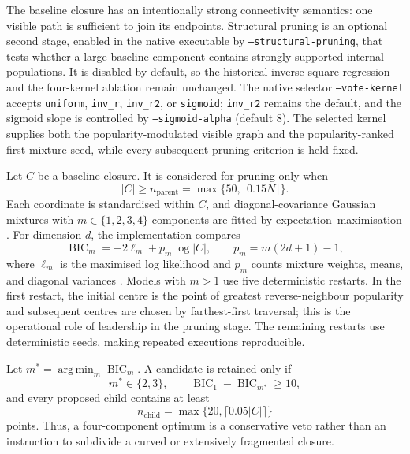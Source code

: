 \documentclass[pdflatex,sn-mathphys-num]{sn-jnl}
\newcommand{\argmin}{\operatorname*{arg\,min}}
\begin{document}
The baseline closure has an intentionally strong connectivity semantics: one
visible path is sufficient to join its endpoints.  Structural pruning is an
optional second stage, enabled in the native executable by
\texttt{--structural-pruning}, that tests whether a large baseline component
contains strongly supported internal populations.  It is disabled by default,
so the historical inverse-square regression and the four-kernel ablation remain
unchanged.  The native selector \texttt{--vote-kernel} accepts
\texttt{uniform}, \texttt{inv\_r}, \texttt{inv\_r2}, or \texttt{sigmoid};
\texttt{inv\_r2} remains the default, and the sigmoid slope is controlled by
\texttt{--sigmoid-alpha} (default $8$).  The selected kernel supplies both the
popularity-modulated visible graph and the popularity-ranked first mixture
seed, while every subsequent pruning criterion is held fixed.

Let $C$ be a baseline closure.  It is considered for pruning only when
\begin{equation}
|C|\geq n_{\mathrm{parent}}
=\max\{50,\lceil0.15N\rceil\}.
\label{eq:pruning_parent_size}
\end{equation}
Each coordinate is standardised within $C$, and diagonal-covariance Gaussian
mixtures with $m\in\{1,2,3,4\}$ components are fitted by expectation--maximisation
\citep{DempsterLairdRubin1977}.  For dimension $d$, the implementation compares
\begin{equation}
\operatorname{BIC}_m=-2\ell_m+p_m\log |C|,
\qquad p_m=m(2d+1)-1,
\label{eq:pruning_bic}
\end{equation}
where $\ell_m$ is the maximised log likelihood and $p_m$ counts mixture
weights, means, and diagonal variances \citep{Schwarz1978}.  Models with
$m>1$ use five deterministic restarts.  In the first restart, the initial
centre is the point of greatest reverse-neighbour popularity and subsequent
centres are chosen by farthest-first traversal; this is the operational role
of leadership in the pruning stage.  The remaining restarts use deterministic
seeds, making repeated executions reproducible.

Let $m^*=\argmin_m\operatorname{BIC}_m$.  A candidate is retained only if
\begin{equation}
m^*\in\{2,3\},\qquad
\operatorname{BIC}_1-\operatorname{BIC}_{m^*}\geq10,
\label{eq:pruning_acceptance}
\end{equation}
and every proposed child contains at least
\begin{equation}
n_{\mathrm{child}}=
\max\{20,\lceil0.05|C|\rceil\}
\label{eq:pruning_child_size}
\end{equation}
points.  Thus, a four-component optimum is a conservative veto rather than an
instruction to subdivide a curved or extensively fragmented closure.
\end{document}
